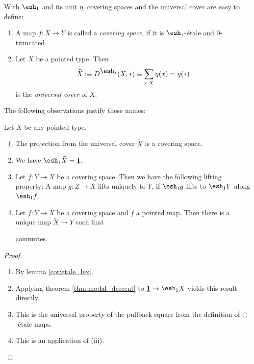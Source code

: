\documentclass[9pt,twosided]{amsart}
\newcommand{\shape}{\ensuremath{\mathord{\raisebox{0.5pt}{\text{\rm\esh}}}}}
\begin{document}
With $\shape_1$ and its unit $\eta$, covering spaces and the universal cover are easy to define:
\begin{defn}
  \begin{enumerate}
  \item A map $f:X\to Y$ is called a \emph{covering space}, if it is $\shape_1$-étale and $0$-truncated.
  \item Let $X$ be a pointed type. Then
    \[ \widetilde{X}:\equiv D^{\shape_1}(X,\ast)\equiv\sum_{x:X}\modalunit(x)=\modalunit(\ast) \]
    is the \emph{universal cover} of $X$.
  \end{enumerate}

\end{defn}
The following observations justify these names:
\begin{rmk}
  Let $X$ be any pointed type.
  \begin{enumerate}
  \item The projection from the universal cover $\widetilde{X}$ is a covering space.
  \item We have $\shape_1 \widetilde{X} = \unit$.
  \item Let $f:Y\to X$ be a covering space. Then we have the following lifting property:
    A map $g:Z\to X$ lifts uniquely to $Y$, if $\shape_1 g$ lifts to $\shape_1 Y$ along $\shape_1 f$.
  \item Let $f:Y\to X$ be a covering space and $f$ a pointed map. Then there is a unique map $\widetilde{X}\to Y$ such that
    \begin{center}
    \end{center}
    commutes.
  \end{enumerate}
\end{rmk}
\begin{proof}
  \begin{enumerate}
  \item By lemma \ref{cor:etale_lex}. 
  \item Applying theorem \ref{thm:modal_descent} to $\unit\to \shape_1 X$ yields this result directly.
  \item This is the universal property of the pullback square from the definition of ${\ocircle}$-étale maps.
  \item This is an application of (iii).
  \end{enumerate}
\end{proof}
\end{document}
